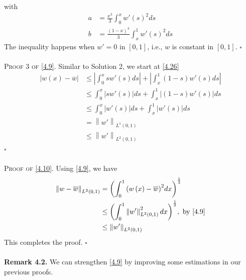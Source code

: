 \documentclass[a4paper]{article}
\numberwithin{equation}{section}
\begin{document}
with 
\begin{align}
a &= \frac{{{x^3}}}{3}\int_0^x {w'{{\left( s \right)}^2}ds} \\
b &= \frac{{{{\left( {1 - x} \right)}^3}}}{3}\int_x^1 {w'{{\left( s \right)}^2}ds} 
\end{align}
The inequality happens when $w'=0$ in $\left[0,1\right]$, i.e., $w$ is constant in $\left[0,1\right]$. \hfill $\square$\\
\\
\textsc{Proof 3 of \eqref{4.9}.} Similar to Solution 2, we start at \eqref{4.26}
\begin{align}
\left| {w\left( x \right) - \overline w } \right| &\le \left| {\int_0^x {sw'\left( s \right)ds} } \right| + \left| {\int_x^1 {\left( {1 - s} \right)w'\left( s \right)ds} } \right|\\
 &\le \int_0^x {\left| {sw'\left( s \right)} \right|ds}  + \int_x^1 {\left| {\left( {1 - s} \right)w'\left( s \right)} \right|ds} \\
& \le \int_0^x {\left| {w'\left( s \right)} \right|ds}  + \int_x^1 {\left| {w'\left( s \right)} \right|ds} \\
& = {\left\| {w'} \right\|_{{L^1}\left( {0,1} \right)}}\\
 &\le {\left\| {w'} \right\|_{{L^2}\left( {0,1} \right)}}
\end{align}
\hfill $\square$\\
\\
\textsc{Proof of \eqref{4.10}.} Using \eqref{4.9}, we have
\begin{align}
\label{4.42}
{\left\| {w - \overline w } \right\|_{{L^2}\left( {0,1} \right)}} &= {\left( {\int_0^1 {{{\left( {w\left( x \right) - \overline w } \right)}^2}dx} } \right)^{\frac{1}{2}}}\\
 &\le {\left( {\int_0^1 {\left\| {w'} \right\|_{{L^2}\left( {0,1} \right)}^2dx} } \right)^{\frac{1}{2}}},\mbox{ by \eqref{4.9}}\\
 &\le {\left\| {w'} \right\|_{{L^2}\left( {0,1} \right)}}
\end{align}
This completes the proof. \hfill $\square$\\
\\
\textbf{Remark 4.2.} We can strengthen \eqref{4.9} by improving some estimations in our previous proofs.
\end{document}
